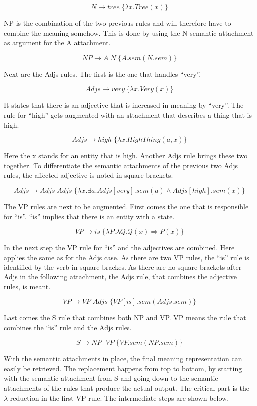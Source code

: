 \documentclass[12pt,twoside]{scrartcl}
\theoremstyle{plain}
\theoremstyle{definition}
\theoremstyle{remark}
\begin{document}
		\[
			N \rightarrow tree \;\{\lambda x.Tree(x)\}
		\]
		
		NP is the combination of the two previous rules and will therefore have to combine the meaning somehow. This is done by using the N semantic attachment as argument for the A attachment.
		
		\[
			NP \rightarrow A\;N \;\{A.sem(N.sem)\}
		\]
		
		Next are the Adjs rules. The first is the one that handles ``very''.
		
		\[
			Adjs \rightarrow very \;\{\lambda x.Very(x)\}
		\]
		
		It states that there is an adjective that is increased in meaning by ``very''. The rule for ``high'' gets augmented with an attachment that describes a thing that is high.
		
		\[
			Adjs \rightarrow high \;\{\lambda x.HighThing(a, x)\}
		\]
		
		Here the x stands for an entity that is high. Another Adjs rule brings these two together. To differentiate the semantic attachments of the previous two Adjs rules, the affected adjective is noted in square brackets.
		
		\[
			Adjs \rightarrow Adjs\;Adjs \;\{\lambda x.\exists a.Adjs[very].sem(a) \wedge Adjs[high].sem(x) \}
		\]
		
		The VP rules are next to be augmented. First comes the one that is responsible for ``is''. ``is'' implies that there is an entity with a state.
		
		\[
			VP \rightarrow is \;\{\lambda P.\lambda Q.Q(x) \Rightarrow P(x)\}
		\]
		
		In the next step the VP rule for ``is'' and the adjectives are combined. Here applies the same as for the Adjs case. As there are two VP rules, the ``is'' rule is identified by the verb in square brackes. As there are no square brackets after Adjs in the following attachment, the Adjs rule, that combines the adjective rules, is meant.
		
		\[
			VP \rightarrow VP\;Adjs \;\{VP[is].sem(Adjs.sem)\}
		\]
		
		Last comes the S rule that combines both NP and VP. VP means the rule that combines the ``is'' rule and the Adjs rules.
		
		\[
			S \rightarrow NP\;\;VP \;\{VP.sem(NP.sem)\}
		\]
		
		With the semantic attachments in place, the final meaning representation can easily be retrieved. The replacement happens from top to bottom, by starting with the semantic attachment from S and going down to the semantic attachments of the rules that produce the actual output. The critical part is the $\lambda$-reduction in the first VP rule. The intermediate steps are shown below.
		
\end{document}
